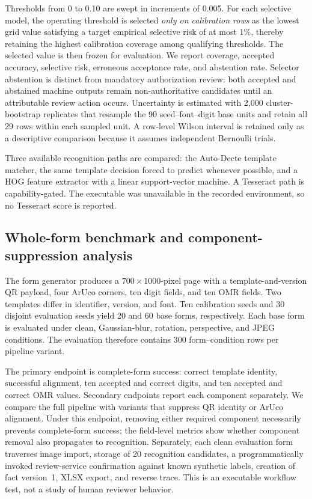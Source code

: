 Thresholds from 0 to 0.10 are swept in increments of 0.005. For each selective model, the operating threshold is selected \emph{only on calibration rows} as the lowest grid value satisfying a target empirical selective risk of at most 1\%, thereby retaining the highest calibration coverage among qualifying thresholds. The selected value is then frozen for evaluation. We report coverage, accepted accuracy, selective risk, erroneous acceptance rate, and abstention rate. Selector abstention is distinct from mandatory authorization review: both accepted and abstained machine outputs remain non-authoritative candidates until an attributable review action occurs. Uncertainty is estimated with 2,000 cluster-bootstrap replicates that resample the 90 seed--font--digit base units and retain all 29 rows within each sampled unit. A row-level Wilson interval is retained only as a descriptive comparison because it assumes independent Bernoulli trials.

Three available recognition paths are compared: the Auto-Decte template matcher, the same template decision forced to predict whenever possible, and a HOG feature extractor with a linear support-vector machine. A Tesseract path is capability-gated. The executable was unavailable in the recorded environment, so no Tesseract score is reported.

\subsection{Whole-form benchmark and component-suppression analysis}
The form generator produces a $700\times1000$-pixel page with a template-and-version QR payload, four ArUco corners, ten digit fields, and ten OMR fields. Two templates differ in identifier, version, and font. Ten calibration seeds and 30 disjoint evaluation seeds yield 20 and 60 base forms, respectively. Each base form is evaluated under clean, Gaussian-blur, rotation, perspective, and JPEG conditions. The evaluation therefore contains 300 form--condition rows per pipeline variant.

The primary endpoint is complete-form success: correct template identity, successful alignment, ten accepted and correct digits, and ten accepted and correct OMR values. Secondary endpoints report each component separately. We compare the full pipeline with variants that suppress QR identity or ArUco alignment. Under this endpoint, removing either required component necessarily prevents complete-form success; the field-level metrics show whether component removal also propagates to recognition. Separately, each clean evaluation form traverses image import, storage of 20 recognition candidates, a programmatically invoked review-service confirmation against known synthetic labels, creation of fact version~1, XLSX export, and reverse trace. This is an executable workflow test, not a study of human reviewer behavior.

